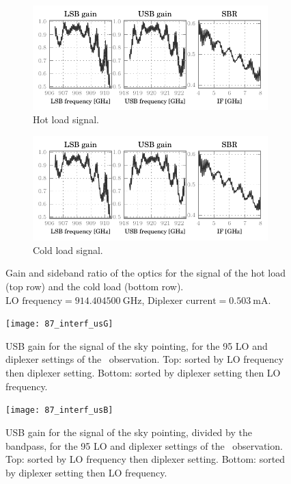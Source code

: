 \begin{figure}
    \centering
    \begin{subfigure}[b]{\textwidth}
        \centering
        \includegraphics{87_00_00_hbb_s_lsbusbsbr}
        \vspace{-.8em}
        \caption{Hot load signal.}
    \end{subfigure}
    \begin{subfigure}[b]{\textwidth}
        \centering
        \includegraphics{87_00_00_cbb_s_lsbusbsbr}
        \vspace{-.8em}
        \caption{Cold load signal.}
    \end{subfigure}
    \caption{Gain and sideband ratio of the optics for the signal of the hot load (top row) and the cold load (bottom row).
    $\text{LO frequency} = \SI{914.404500}{\giga\hertz}$,
    $\text{Diplexer current} = \SI{0.503}{\milli\ampere}$.
    }
    \label{fig:87_00_00_xbb_s_lsbusbsbr}
\end{figure}

\begin{figure}
    \centering
    \texttt{[image: 87\_interf\_usG]}
    \caption{USB gain for the signal of the sky pointing, for the 95 LO and diplexer settings of the~ observation.
    Top: sorted by LO frequency then diplexer setting.
    Bottom: sorted by diplexer setting then LO frequency.}
    \label{fig:87_interf_usG}
\end{figure}
\begin{figure}
    \centering
    \texttt{[image: 87\_interf\_usB]}
    \caption{USB gain for the signal of the sky pointing, divided by the bandpass, for the 95 LO and diplexer settings of the~ observation.
    Top: sorted by LO frequency then diplexer setting.
    Bottom: sorted by diplexer setting then LO frequency.}
    \label{fig:87_interf_usB}
\end{figure}

